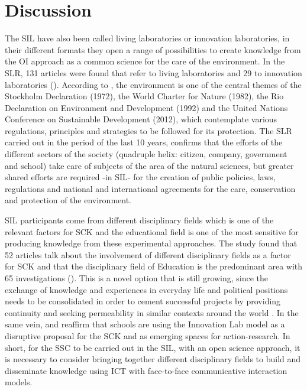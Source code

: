 \documentclass[english]{textolivre}
\begin{document}
\section{Discussion}
The SIL have also been called living laboratories or innovation laboratories, in their different formats they open a range of possibilities to create knowledge from the OI approach as a common science for the care of the environment. In the SLR, 131 articles were found that refer to living laboratories and 29 to innovation laboratories (). According to \textcite{castro2020, zambrano2020}, the environment is one of the central themes of the Stockholm Declaration (1972), the World Charter for Nature (1982), the Rio Declaration on Environment and Development (1992) and the United Nations Conference on Sustainable Development (2012), which contemplate various regulations, principles and strategies to be followed for its protection. The SLR carried out in the period of the last 10 years, confirms that the efforts of the different sectors of the society (quadruple helix: citizen, company, government and school) take care of subjects of the area of the natural sciences, but greater shared efforts are required -in SIL- for the creation of public policies, laws, regulations and national and international agreements for the care, conservation and protection of the environment.

SIL participants come from different disciplinary fields which is one of the relevant factors for SCK and the educational field is one of the most sensitive for producing knowledge from these experimental approaches. The study found that 52 articles talk about the involvement of different disciplinary fields as a factor for SCK and that the disciplinary field of Education is the predominant area with 65 investigations (). This is a novel option that is still growing, since the exchange of knowledge and experiences in everyday life and political positions needs to be consolidated in order to cement successful projects by providing continuity and seeking permeability in similar contexts around the world \cite{garcia+lopez2020}. In the same vein, \textcite{evans2015} and \textcite{alonso2020} reaffirm that schools are using the Innovation Lab model as a disruptive proposal for the SCK and as emerging spaces for action-research.  In short, for the SSC to be carried out in the SIL, with an open science approach, it is necessary to consider bringing together different disciplinary fields to build and disseminate knowledge using ICT with face-to-face communicative interaction models.
\end{document}

